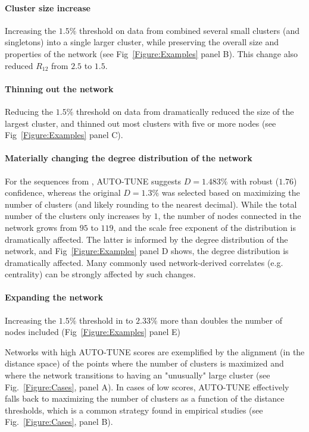 \documentclass[utf8]{FrontiersinHarvard} %
\begin{document}
\paragraph{Cluster size increase}  Increasing the $1.5\%$ threshold on data
from \citet{Little:2014aa} combined several small clusters (and singletons)
into a single larger cluster, while preserving the overall size and properties
of the network (see Fig~\ref{Figure:Examples} panel B). This change also reduced
$R_{12}$ from $2.5$ to $1.5$.

\paragraph{Thinning out the network}  Reducing the $1.5\%$ threshold on data
from \citet{rhee_national_2019} dramatically reduced the size of the largest
cluster, and thinned out most clusters with five or more nodes (see
Fig~\ref{Figure:Examples} panel C).

\paragraph{Materially changing the degree distribution of the network}  For the
sequences from \citet{Li:2022aa}, AUTO-TUNE suggests $D = 1.483\%$ with robust
($1.76$) confidence, whereas the original $D=1.3\%$ was selected based on
maximizing the number of clusters (and likely rounding to the nearest decimal).
While the total number of the clusters only increases by $1$, the number of
nodes connected in the network grows from $95$ to $119$, and the scale free
exponent of the distribution is dramatically affected. The latter is informed
by the degree distribution of the network, and Fig~\ref{Figure:Examples} panel D
shows, the degree distribution is dramatically affected. Many commonly used
network-derived correlates (e.g. centrality) can be strongly affected by such
changes.

\paragraph{Expanding the network}  Increasing the $1.5\%$ threshold in
\citet{Billings:2019aa} to $2.33\%$ more than doubles the number of nodes
included (Fig~\ref{Figure:Examples} panel E)

Networks with high AUTO-TUNE scores are exemplified by the alignment (in the
distance space) of the points where the number of clusters is maximized and
where the network transitions to having an "unusually" large cluster (see
Fig.~\ref{Figure:Cases}, panel A). In cases of low scores, AUTO-TUNE effectively
falls back to maximizing the number of clusters as a function of the distance
thresholds, which is a common strategy found in empirical studies (see
Fig.~\ref{Figure:Cases}, panel B). 
\end{document}
